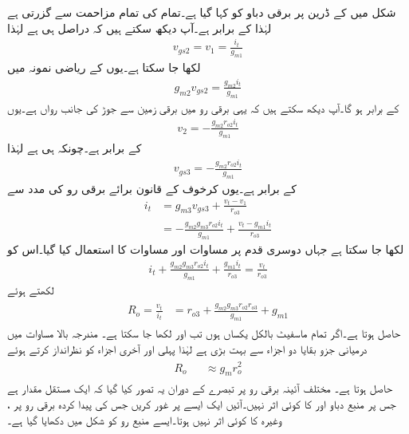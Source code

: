 شکل  میں  کے ڈرین پر برقی دباو کو  کہا گیا ہے۔تمام کی تمام  مزاحمت  سے گزرتی ہے لہٰذا  کے برابر ہے۔آپ دیکھ سکتے ہیں کہ  دراصل  ہی ہے لہٰذا
\begin{align}\label{مساوات_تفرقی_ولسن_پہلا_ماسفیٹ}
v_{gs2}=v_{1}=\frac{i_t}{g_{m1}}
\end{align}
لکھا جا سکتا ہے۔یوں  کے ریاضی نمونہ میں
\begin{align*}
g_{m2} v_{gs2}=\frac{g_{m2} i_t}{g_{m1}}
\end{align*}
کے برابر ہو گا۔آپ دیکھ سکتے ہیں کہ یہی برقی رو  میں برقی زمین سے جوڑ  کی جانب رواں ہے۔یوں
\begin{align*}
v_2=-\frac{g_{m2} r_{o2} i_t}{g_{m1}}
\end{align*}
کے برابر ہے۔چونکہ  ہی ہے لہٰذا
\begin{align}\label{مساوات_تفرقی_ماسفیٹ_ولسن_تیسرا_ماسفیٹ}
v_{gs3}=-\frac{g_{m2} r_{o2} i_t}{g_{m1}}
\end{align}
کے برابر ہے۔یوں کرخوف کے قانون برائے برقی رو کی مدد سے
\begin{align*}
i_t&=g_{m3} v_{gs3}+\frac{v_t-v_1}{r_{o3}}\\
&=-\frac{g_{m2} g_{m3} r_{o2} i_t}{g_{m1}}+\frac{v_t-g_{m1} i_t}{r_{o3}}
\end{align*}
لکھا جا سکتا ہے جہاں دوسری قدم پر مساوات  اور مساوات  کا استعمال کیا گیا۔اس کو
\begin{align*}
i_t+\frac{g_{m2} g_{m3} r_{o2} i_t}{g_{m1}}+\frac{g_{m1} i_t}{r_{o3}}=\frac{v_t}{r_{o3}}
\end{align*}
لکھتے ہوئے
\begin{gather}
\begin{aligned}
R_o=\frac{v_t}{i_t}&=r_{o3}+\frac{g_{m2}g_{m3} r_{o2} r_{o3} }{g_{m1}} +g_{m1}
\end{aligned}
\end{gather}
حاصل ہوتا ہے۔اگر  تمام ماسفیٹ بالکل یکساں ہوں تب  اور  لکھا جا سکتا ہے۔ مندرجہ بالا مساوات میں درمیانی جزو بقایا دو اجزاء سے بہت بڑی ہے لہٰذا  پہلی اور آخری اجزاء کو نظرانداز کرتے ہوئے
\begin{gather}
\begin{aligned}
R_o & & \approx g_m r_o^2
\end{aligned} 
\end{gather}
حاصل ہوتا ہے۔
مختلف آئینہ برقی رو پر تبصرے کے دوران یہ تصور کیا گیا کہ  ایک مستقل مقدار ہے جس پر منبع دباو  اور  کا کوئی اثر نہیں۔آئیں ایک ایسے  پر غور کریں جس کی پیدا کردہ برقی رو پر  ،  وغیرہ کا کوئی اثر نہیں ہوتا۔ایسے  منبع رو کو شکل  میں دکھایا گیا ہے۔

